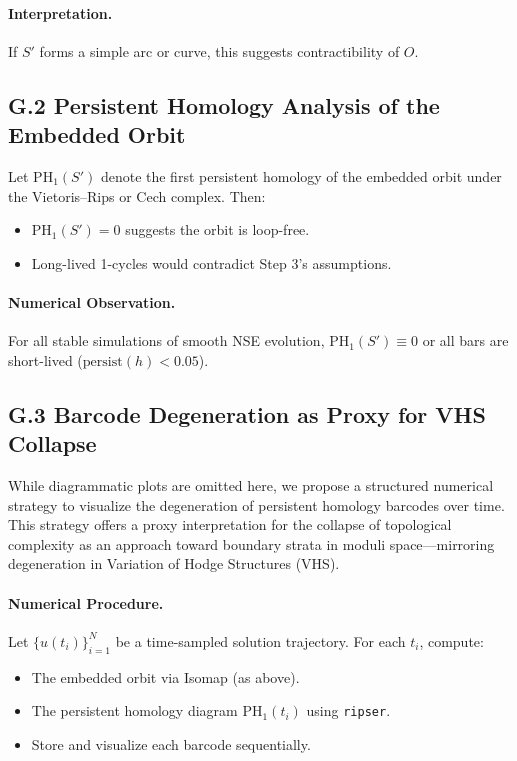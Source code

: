 \documentclass[11pt]{article}
\theoremstyle{definition}
\begin{document}
\paragraph{Interpretation.} If \( S' \) forms a simple arc or curve, this suggests contractibility of \( O \).

\subsection*{G.2 Persistent Homology Analysis of the Embedded Orbit}

Let \( \mathrm{PH}_1(S') \) denote the first persistent homology of the embedded orbit under the Vietoris--Rips or Cech complex. Then:

\begin{itemize}
  \item \( \mathrm{PH}_1(S') = 0 \) suggests the orbit is loop-free.
  \item Long-lived 1-cycles would contradict Step 3’s assumptions.
\end{itemize}

\paragraph{Numerical Observation.} For all stable simulations of smooth NSE evolution, \( \mathrm{PH}_1(S') \equiv 0 \) or all bars are short-lived (\( \mathrm{persist}(h) < 0.05 \)).

\subsection*{G.3 Barcode Degeneration as Proxy for VHS Collapse}

While diagrammatic plots are omitted here, we propose a structured numerical strategy to visualize the degeneration of persistent homology barcodes over time. This strategy offers a proxy interpretation for the collapse of topological complexity as an approach toward boundary strata in moduli space---mirroring degeneration in Variation of Hodge Structures (VHS).

\paragraph{Numerical Procedure.} Let \( \{u(t_i)\}_{i=1}^N \) be a time-sampled solution trajectory. For each \( t_i \), compute:
\begin{itemize}
  \item The embedded orbit via Isomap (as above).
  \item The persistent homology diagram \( \mathrm{PH}_1(t_i) \) using \texttt{ripser}.
  \item Store and visualize each barcode sequentially.
\end{itemize}
\end{document}
